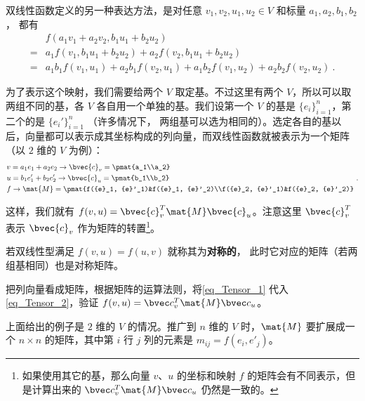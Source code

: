双线性函数定义的另一种表达方法，是对任意 $v_1, v_2, u_1, u_2\in V$ 和标量 $a_1,a_2,b_1,b_2$， 都有
\begin{equation}\label{eq_Tensor_2}
\begin{aligned}
 &f(a_1{v}_1+a_2{v}_2, b_1{u}_1+b_2{u}_2)\\
={}&a_1f({v}_1, b_1{u}_1+b_2{u}_2)+a_2f({v}_2, b_1{u}_1+b_2{u}_2)\\
={}&a_1b_1f({v}_1, {u}_1)+a_2b_1f({v}_2, {u}_1)+a_1b_2f({v}_1, {u}_2)+a_2b_2f({v}_2, {u}_2)~.
\end{aligned}
\end{equation}

为了表示这个映射，我们需要给两个 $V$ 取定基。不过这里有两个 $V$，所以可以取两组不同的基，各 $V$ 各自用一个单独的基。我们设第一个 $V$ 的基是 $\{{e}_i\}^n_{i=1}$，第二个的是 $\{{e}_i'\}^n_{i=1}$ （许多情况下， 两组基可以选为相同的）。选定各自的基以后，向量都可以表示成其坐标构成的列向量，而双线性函数就被表示为一个矩阵（以 $2$ 维的 $V$ 为例）：
\begin{equation}\label{eq_Tensor_1}
\begin{aligned}
&{v}=a_1{e}_1+a_2{e}_2\rightarrow   \bvec{c}_v =\pmat{a_1\\a_2}\\
&{u}=b_1{e}'_1+b_2{e}'_2\rightarrow  \bvec{c}_u =\pmat{b_1\\b_2}\\
&f\rightarrow \mat{M}=\pmat{f({e}_1, {e}'_1)&f({e}_1, {e}'_2)\\f({e}_2, {e}'_1)&f({e}_2, {e}'_2)}\\
\end{aligned}~.
\end{equation}

这样，我们就有 $f({v}, {u})=  \bvec{c}_v^T \mat{M} \bvec{c}_u$。注意这里 $\bvec{c}_v^T$ 表示 $ \bvec{c}_v$ 作为矩阵的转置\footnote{如果使用其它的基，那么向量 ${v}$、${u}$ 的坐标和映射 $f$ 的矩阵会有不同表示，但是计算出来的 $ \bvec c_v^T\mat{M}  \bvec c_u$ 仍然是一致的。}。

若双线性型满足 $f(v, u) = f(u, v)$ 就称其为\textbf{对称的}， 此时它对应的矩阵（若两组基相同）也是对称矩阵。

\begin{exercise}{}\label{exe_Tensor_1}
把列向量看成矩阵，根据矩阵的运算法则，将\autoref{eq_Tensor_1} 代入\autoref{eq_Tensor_2}，验证 $f({v}, {u})=  \bvec c_v^T\mat{M}  \bvec c_u$。
\end{exercise}

上面给出的例子是 $2$ 维的 $V$ 的情况。推广到 $n$ 维的 $V$ 时，$\mat{M}$ 要扩展成一个 $n\times n$ 的矩阵，其中第 $i$ 行 $j$ 列的元素是 $m_{ij}=f({e}_i, {e}'_j)$。

